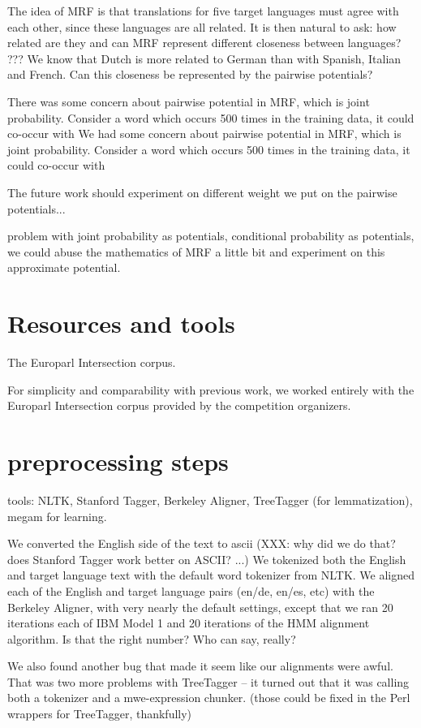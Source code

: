 \documentclass[11pt,letterpaper]{article}
\begin{document}
The idea of MRF is that translations for five target languages must agree with
each other, since these languages are all related.  It is then natural to ask:
how related are they and can MRF represent different closeness between
languages?  ???  We know that Dutch is more related to German than with
Spanish, Italian and French. Can this closeness be represented by the pairwise
potentials?

There was some concern about pairwise potential in MRF, which is joint probability. Consider a word which occurs 500 times in the training data, it could co-occur with
We had some concern about pairwise potential in MRF, which is joint
probability. Consider a word which occurs 500 times in the training data, it
could co-occur with

The future work should experiment on different weight we put on the pairwise
potentials...

problem with joint probability as potentials, conditional probability as
potentials, we could abuse the mathematics of MRF a little bit and experiment
on this approximate potential.

\section{Resources and tools}
The Europarl Intersection corpus.

For simplicity and comparability with previous work, we worked entirely with
the Europarl Intersection corpus provided by the competition organizers.
	

\section{preprocessing steps}
tools: NLTK, Stanford Tagger, Berkeley Aligner, TreeTagger (for lemmatization),
megam for learning.

We converted the English side of the text to ascii (XXX: why did we do that?
does Stanford Tagger work better on ASCII? ...) We tokenized both the English
and target language text with the default word tokenizer from NLTK.  We aligned
each of the English and target language pairs (en/de, en/es, etc) with the
Berkeley Aligner, with very nearly the default settings, except that we ran 20
iterations each of IBM Model 1 and 20 iterations of the HMM alignment
algorithm. Is that the right number? Who can say, really?

We also found another bug that made it seem like our alignments were awful.
That was two more problems with TreeTagger -- it turned out that it was calling
both a tokenizer and a mwe-expression chunker. (those could be fixed in the
Perl wrappers for TreeTagger, thankfully)
\end{document}
